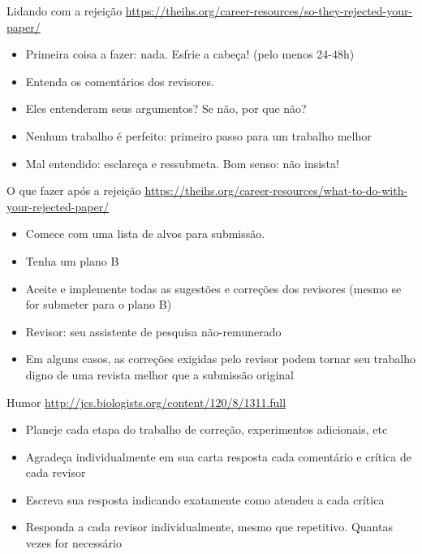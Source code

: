 \documentclass{beamer}
\begin{document}
\begin{frame}{Lidando com a rejeição}
  \url{https://theihs.org/career-resources/so-they-rejected-your-paper/}

  \begin{itemize}
  \item Primeira coisa a fazer: nada. Esfrie a cabeça! (pelo menos 24-48h)
  \item Entenda os comentários dos revisores.
  \item Eles entenderam seus argumentos? Se não, por que não?
  \item Nenhum trabalho é perfeito: primeiro passo para um trabalho
    melhor
  \item Mal entendido: esclareça e ressubmeta. Bom senso: não insista!
  \end{itemize}
\end{frame}

\begin{frame}{O que fazer após a rejeição}
  \url{https://theihs.org/career-resources/what-to-do-with-your-rejected-paper/}
  \begin{itemize}
  \item Comece com uma lista de alvos para submissão.
  \item Tenha um plano B
  \item Aceite e implemente todas as sugestões e correções dos
    revisores (mesmo se for submeter para o plano B)
  \item Revisor: seu assistente de pesquisa não-remunerado
  \item Em alguns casos, as correções exigidas pelo revisor podem
    tornar seu trabalho digno de uma revista melhor que a submissão original
  \end{itemize}
\end{frame}

\begin{frame}{Humor}
  \url{http://jcs.biologists.org/content/120/8/1311.full}

  \begin{itemize}
  \item Planeje cada etapa do trabalho de correção, experimentos
    adicionais, etc
  \item Agradeça individualmente em sua carta resposta cada comentário
    e crítica de cada revisor
  \item Escreva sua resposta indicando exatamente \alert{como} atendeu
    a \alert{cada} crítica
  \item Responda a cada revisor individualmente, mesmo que
    repetitivo. Quantas vezes for necessário
  \end{itemize}
\end{frame}
\end{document}
